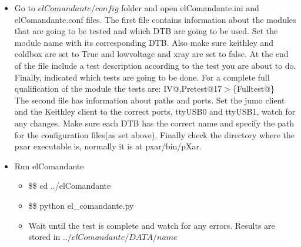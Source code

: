 \documentclass[12pt]{unlsilabsop}
\makeatletter
\newcommand{\at}{\makeatletter @\makeatother}
\makeatother
\begin{document}
\begin{enumerate}
\begin{itemize}
		\item Go to $elComandante/config$ folder and open elComandante.ini and elComandante.conf files. The first file contains information about the modules that are going to be tested and which DTB are going to be used. Set the module name with its corresponding DTB. Also make sure keithley and coldbox are set to True and lowvoltage and xray are set to false. At the end of the file include a test description according to the test you are about to do. Finally, indicated which tests are going to be done. For a complete full qualification of the module the tests are: IV\at 17,Pretest{\at}17$>$\{Fulltest\at 17\}\\
		The second file has information about paths and ports. Set the jumo client and the Keithley client to the correct ports, ttyUSB0 and ttyUSB1, watch for any changes. Make sure each DTB has the correct name and specify the path for the configuration files(as set above). Finally check the directory where the pxar executable is, normally it is at pxar/bin/pXar.
		\item Run elComandante
		\begin{itemize}
			\item \$\$ cd ../elComandante
			\item \$\$ python el\_comandante.py
			\item Wait until the test is complete and watch for any errors. Results are stored in $../elComandante/DATA/name$
		\end{itemize}
	\end{itemize}
   

\end{enumerate}
\end{document}
